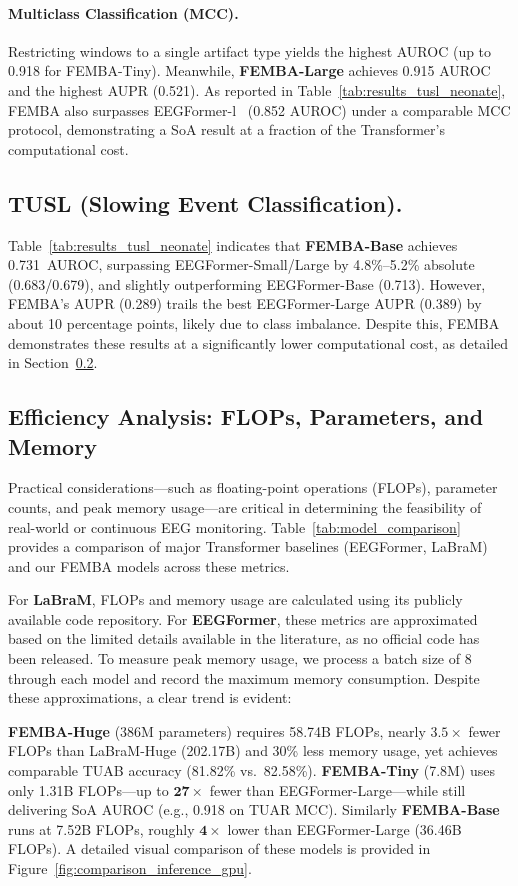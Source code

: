 \paragraph{Multiclass Classification (MCC).}
Restricting windows to a single artifact type yields the highest AUROC (up to 0.918 for FEMBA-Tiny). Meanwhile, \textbf{FEMBA-Large} achieves 0.915 AUROC and the highest AUPR (0.521). As reported in Table~\ref{tab:results_tusl_neonate}, FEMBA also surpasses EEGFormer-l~\cite{chen2024eegformer} (0.852 AUROC) under a comparable MCC protocol, demonstrating a SoA result at a fraction of the Transformer’s computational cost.

\subsection{TUSL (Slowing Event Classification).}
Table~\ref{tab:results_tusl_neonate} indicates that \textbf{FEMBA-Base} achieves 0.731~AUROC, surpassing EEGFormer-Small/Large by 4.8\%–5.2\% absolute (0.683/0.679), and slightly outperforming EEGFormer-Base (0.713). However, FEMBA’s AUPR (0.289) trails the best EEGFormer-Large AUPR (0.389) by about 10 percentage points, likely due to class imbalance. Despite this, FEMBA demonstrates these results at a significantly lower computational cost, as detailed in Section~\ref{subsec:efficiency}.

\subsection{Efficiency Analysis: FLOPs, Parameters, and Memory}\label{subsec:efficiency}
Practical considerations—such as floating-point operations (FLOPs), parameter counts, and peak memory usage—are critical in determining the feasibility of real-world or continuous EEG monitoring. Table~\ref{tab:model_comparison} provides a comparison of major Transformer baselines (EEGFormer, LaBraM) and our FEMBA models across these metrics.

For \textbf{LaBraM}, FLOPs and memory usage are calculated using its publicly available code repository. For \textbf{EEGFormer}, these metrics are approximated based on the limited details available in the literature, as no official code has been released. To measure peak memory usage, we process a batch size of 8 through each model and record the maximum memory consumption. Despite these approximations, a clear trend is evident:

\textbf{FEMBA-Huge} (386M parameters) requires 58.74B FLOPs, nearly \(\mathbf{3.5\times}\) fewer FLOPs than LaBraM-Huge (202.17B) and 30\% less memory usage, yet achieves comparable TUAB accuracy (81.82\% vs.\ 82.58\%).  \textbf{FEMBA-Tiny} (7.8M) uses only 1.31B FLOPs—up to \(\mathbf{27\times}\) fewer than EEGFormer-Large—while still delivering SoA AUROC (e.g., 0.918 on TUAR MCC). Similarly \textbf{FEMBA-Base} runs at 7.52B FLOPs, roughly \(\mathbf{4\times}\) lower than EEGFormer-Large (36.46B FLOPs). A detailed visual comparison of these models is provided in Figure~\ref{fig:comparison_inference_gpu}.



